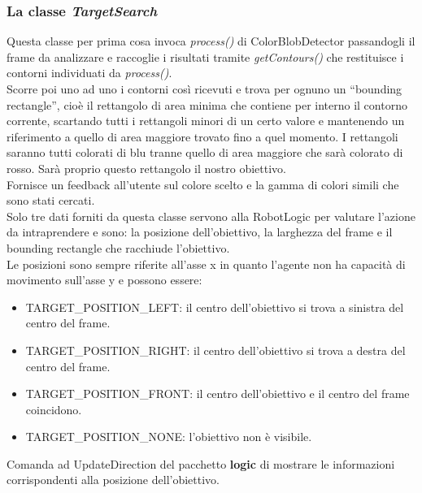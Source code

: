 \subsubsection{La classe \emph{TargetSearch}}
Questa classe per prima cosa invoca \emph{process()} di ColorBlobDetector passandogli
il frame da analizzare e raccoglie i risultati tramite \emph{getContours()} che restituisce 
i contorni individuati da \emph{process()}.\\
Scorre poi uno ad uno i contorni così ricevuti e trova per ognuno un ``bounding rectangle'', 
cioè il rettangolo di area minima che contiene per interno il contorno corrente, 
scartando tutti i rettangoli minori di un certo valore e mantenendo un riferimento 
a quello di area maggiore trovato fino a quel momento. I rettangoli saranno tutti colorati di blu
 tranne quello di area maggiore che sarà colorato di rosso. Sarà proprio questo 
 rettangolo il nostro obiettivo.\\
 Fornisce un feedback all'utente sul colore scelto e la gamma di colori simili 
 che sono stati cercati.\\
 Solo tre dati forniti da questa classe servono alla RobotLogic per valutare l'azione 
 da intraprendere e sono:
 la posizione dell'obiettivo, la larghezza del frame e il bounding rectangle 
 che racchiude l'obiettivo.\\
 Le posizioni sono sempre riferite all'asse x in quanto l'agente non 
 ha capacità di movimento sull'asse y e possono essere:
 \begin{itemize}
	\item TARGET\_POSITION\_LEFT: il centro dell'obiettivo si trova a sinistra del centro del frame. 
	\item TARGET\_POSITION\_RIGHT: il centro dell'obiettivo si trova a destra del centro del frame. 
	\item TARGET\_POSITION\_FRONT: il centro dell'obiettivo e il centro del frame coincidono. 
	\item TARGET\_POSITION\_NONE: l'obiettivo non è visibile.
\end{itemize}
Comanda ad UpdateDirection del pacchetto \textbf{logic} di mostrare le informazioni 
corrispondenti alla posizione dell'obiettivo.

